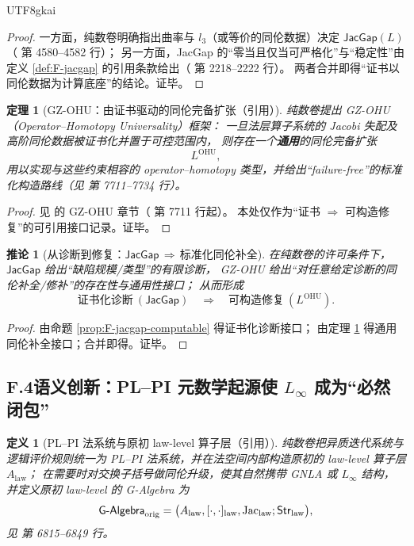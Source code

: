 \documentclass[12pt]{article}
\newtheorem{definition}{定义}[section]
\newtheorem{theorem}{定理}[section]
\newtheorem{corollary}{推论}[section]
\begin{document}
\begin{CJK*}{UTF8}{gkai}
\begin{proof}
一方面，纯数卷明确指出曲率与 $l_3$（或等价的同伦数据）决定 $\mathsf{JacGap}(L)$（\cite{GaoZheng2025GFramework} 第 4580--4582 行）；
另一方面，JacGap 的“零当且仅当可严格化”与“稳定性”由定义 \ref{def:F-jacgap} 的引用条款给出（\cite{GaoZheng2025GFramework} 第 2218--2222 行）。
两者合并即得“证书以同伦数据为计算底座”的结论。证毕。
\end{proof}

\begin{theorem}[GZ-OHU：由证书驱动的同伦完备扩张（引用）]\label{thm:F-gz-ohu}
纯数卷提出 GZ-OHU（Operator--Homotopy Universality）框架：
一旦法层算子系统的 Jacobi 失配及高阶同伦数据被证书化并置于可控范围内，
则存在一个\textbf{通用}的同伦完备扩张
\[
  L^{\mathrm{OHU}},
\]
用以实现与这些约束相容的 operator--homotopy 类型，并给出“failure-free”的标准化构造路线（见 \cite{GaoZheng2025GFramework} 第 7711--7734 行）。
\end{theorem}

\begin{proof}
见 \cite{GaoZheng2025GFramework} 的 GZ-OHU 章节（\cite{GaoZheng2025GFramework} 第 7711 行起）。
本处仅作为“证书 $\Rightarrow$ 可构造修复”的可引用接口记录。证毕。
\end{proof}

\begin{corollary}[从诊断到修复：$\mathsf{JacGap}$\,$\Rightarrow$\,标准化同伦补全]\label{cor:F-diagnose-to-repair}
在纯数卷的许可条件下，
$\mathsf{JacGap}$ 给出“缺陷规模/类型”的有限诊断，
GZ-OHU 给出“对任意给定诊断的同伦补全/修补”的存在性与通用性接口；
从而形成
\[
  \text{证书化诊断}\ (\mathsf{JacGap})
  \quad\Longrightarrow\quad
  \text{可构造修复}\ (L^{\mathrm{OHU}}).
\]
\end{corollary}

\begin{proof}
由命题 \ref{prop:F-jacgap-computable} 得证书化诊断接口；
由定理 \ref{thm:F-gz-ohu} 得通用同伦补全接口；合并即得。证毕。
\end{proof}

\subsection{F.4\;语义创新：PL--PI 元数学起源使 $L_\infty$ 成为“必然闭包”}

\begin{definition}[PL--PI 法系统与原初 law-level 算子层（引用）]\label{def:F-plpi-origin}
纯数卷把异质迭代系统与逻辑评价规则统一为 PL--PI 法系统，并在法空间内部构造原初的 law-level 算子层
$A_{\mathrm{law}}$；
在需要时对交换子括号做同伦升级，使其自然携带 GNLA 或 $L_\infty$ 结构，
并定义原初 law-level 的 G-Algebra 为
\[
  \mathsf{G\text{-}Algebra}_{\mathrm{orig}}
  =
  \bigl(A_{\mathrm{law}},[\cdot,\cdot]_{\mathrm{law}},\operatorname{Jac}_{\mathrm{law}};\mathsf{Str}_{\mathrm{law}}\bigr),
\]
见 \cite{GaoZheng2025GFramework} 第 6815--6849 行。
\end{definition}


\end{CJK*}
\end{document}
